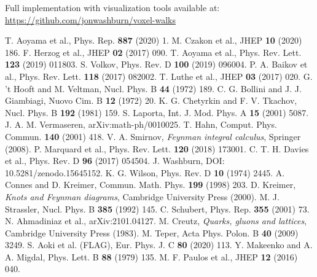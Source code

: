 \documentclass[11pt,a4paper]{article}
\theoremstyle{definition}
\theoremstyle{remark}
\begin{document}
Full implementation with visualization tools available at: \\
\url{https://github.com/jonwashburn/voxel-walks}

\begin{thebibliography}{99}

 T. Aoyama et al., Phys. Rep. \textbf{887} (2020) 1.
 M. Czakon et al., JHEP \textbf{10} (2020) 186.
 F. Herzog et al., JHEP \textbf{02} (2017) 090.
 T. Aoyama et al., Phys. Rev. Lett. \textbf{123} (2019) 011803.
 S. Volkov, Phys. Rev. D \textbf{100} (2019) 096004.
 P. A. Baikov et al., Phys. Rev. Lett. \textbf{118} (2017) 082002.
 T. Luthe et al., JHEP \textbf{03} (2017) 020.
 G. 't Hooft and M. Veltman, Nucl. Phys. B \textbf{44} (1972) 189.
 C. G. Bollini and J. J. Giambiagi, Nuovo Cim. B \textbf{12} (1972) 20.
 K. G. Chetyrkin and F. V. Tkachov, Nucl. Phys. B \textbf{192} (1981) 159.
 S. Laporta, Int. J. Mod. Phys. A \textbf{15} (2001) 5087.
 J. A. M. Vermaseren, arXiv:math-ph/0010025.
 T. Hahn, Comput. Phys. Commun. \textbf{140} (2001) 418.
 V. A. Smirnov, \emph{Feynman integral calculus}, Springer (2008).
 P. Marquard et al., Phys. Rev. Lett. \textbf{120} (2018) 173001.
 C. T. H. Davies et al., Phys. Rev. D \textbf{96} (2017) 054504.
 J. Washburn, DOI: 10.5281/zenodo.15645152.
 K. G. Wilson, Phys. Rev. D \textbf{10} (1974) 2445.
 A. Connes and D. Kreimer, Commun. Math. Phys. \textbf{199} (1998) 203.
 D. Kreimer, \emph{Knots and Feynman diagrams}, Cambridge University Press (2000).
 M. J. Strassler, Nucl. Phys. B \textbf{385} (1992) 145.
 C. Schubert, Phys. Rep. \textbf{355} (2001) 73.
 N. Ahmadiniaz et al., arXiv:2101.04127.
 M. Creutz, \emph{Quarks, gluons and lattices}, Cambridge University Press (1983).
 M. Teper, Acta Phys. Polon. B \textbf{40} (2009) 3249.
 S. Aoki et al. (FLAG), Eur. Phys. J. C \textbf{80} (2020) 113.
 Y. Makeenko and A. A. Migdal, Phys. Lett. B \textbf{88} (1979) 135.
 M. F. Paulos et al., JHEP \textbf{12} (2016) 040.

\end{thebibliography}
\end{document}
